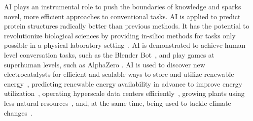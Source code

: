 AI plays an instrumental role to push the boundaries of knowledge and sparks novel, more efficient approaches to conventional tasks.
AI is applied to predict protein structures radically better than previous methods. It has the potential to revolutionize biological sciences by providing in-silico methods for tasks only possible in a physical laboratory setting~\cite{AlphaFold}. 
AI is demonstrated to achieve human-level conversation tasks, such as the Blender Bot~\cite{Komeili:arxiv:2021}, and play games at superhuman levels, such as AlphaZero \cite{AlphaZero}.
AI is used to discover new electrocatalysts for efficient and scalable ways to store and utilize renewable energy~\cite{open-catalyst}, predicting renewable energy availability in advance to improve energy utilization~\cite{AI-load-shaping}, 
operating hyperscale data centers efficiently~\cite{google-cloud}, 
growing plants using less natural resources~\cite{robot-farms}, and, at the same time,
being used to tackle climate changes~\cite{rolnick:arxiv:2019,Nishant:IJIM:2020}.
